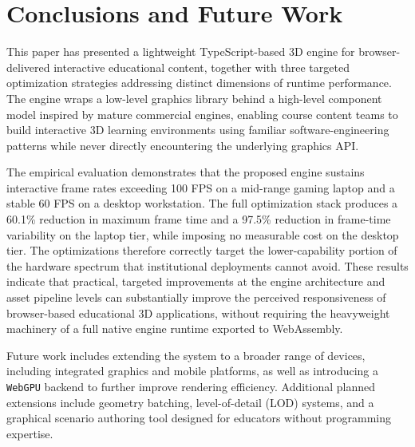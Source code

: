 \section{Conclusions and Future Work}
This paper has presented a lightweight TypeScript-based 3D engine for browser-delivered interactive educational content, together with three targeted optimization strategies addressing distinct dimensions of runtime performance. The engine wraps a low-level graphics library behind a high-level component model inspired by mature commercial engines, enabling course content teams to build interactive 3D learning environments using familiar software-engineering patterns while never directly encountering the underlying graphics API.

The empirical evaluation demonstrates that the proposed engine sustains interactive frame rates exceeding 100 FPS on a mid-range gaming laptop and a stable 60 FPS on a desktop workstation. The full optimization stack produces a 60.1\% reduction in maximum frame time and a 97.5\% reduction in frame-time variability on the laptop tier, while imposing no measurable cost on the desktop tier. The optimizations therefore correctly target the lower-capability portion of the hardware spectrum that institutional deployments cannot avoid. These results indicate that practical, targeted improvements at the engine architecture and asset pipeline levels can substantially improve the perceived responsiveness of browser-based educational 3D applications, without requiring the heavyweight machinery of a full native engine runtime exported to WebAssembly.

Future work includes extending the system to a broader range of devices, including integrated graphics and mobile platforms, as well as introducing a \texttt{WebGPU} backend to further improve rendering efficiency. Additional planned extensions include geometry batching, level-of-detail (LOD) systems, and a graphical scenario authoring tool designed for educators without programming expertise.
